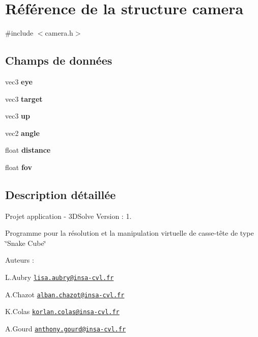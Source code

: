 \hypertarget{structcamera}{\section{Référence de la structure camera}
\label{structcamera}
}


{\ttfamily \#include $<$camera.\-h$>$}

\subsection*{Champs de données}
\begin{DoxyCompactItemize}
\item 
\hypertarget{structcamera_a59c7cca5ec718e42f0b3d58b033932c1}{vec3 {\bfseries eye}}\label{structcamera_a59c7cca5ec718e42f0b3d58b033932c1}

\item 
\hypertarget{structcamera_a71f586eb04bc4185d0d3c4c366e63896}{vec3 {\bfseries target}}\label{structcamera_a71f586eb04bc4185d0d3c4c366e63896}

\item 
\hypertarget{structcamera_af25e132b20481c5c82d8394e0beeea4a}{vec3 {\bfseries up}}\label{structcamera_af25e132b20481c5c82d8394e0beeea4a}

\item 
\hypertarget{structcamera_a4a261f99dfaa5397faf5fc9eba20218b}{vec2 {\bfseries angle}}\label{structcamera_a4a261f99dfaa5397faf5fc9eba20218b}

\item 
\hypertarget{structcamera_a06f14a9abd47b91465f895d5259cdc1b}{float {\bfseries distance}}\label{structcamera_a06f14a9abd47b91465f895d5259cdc1b}

\item 
\hypertarget{structcamera_abfd94a01fc71278021802ca0d1e25e16}{float {\bfseries fov}}\label{structcamera_abfd94a01fc71278021802ca0d1e25e16}

\end{DoxyCompactItemize}


\subsection{Description détaillée}
Projet application -\/ 3\-D\-Solve Version \-: 1.

Programme pour la résolution et la manipulation virtuelle de casse-\/tête de type \char`\"{}\-Snake Cube\char`\"{}

Auteurs \-:
\begin{DoxyItemize}
\item L.\-Aubry \href{mailto:lisa.aubry@insa-cvl.fr}{\tt lisa.\-aubry@insa-\/cvl.\-fr}
\item A.\-Chazot \href{mailto:alban.chazot@insa-cvl.fr}{\tt alban.\-chazot@insa-\/cvl.\-fr}
\item K.\-Colas \href{mailto:korlan.colas@insa-cvl.fr}{\tt korlan.\-colas@insa-\/cvl.\-fr}
\item A.\-Gourd \href{mailto:anthony.gourd@insa-cvl.fr}{\tt anthony.\-gourd@insa-\/cvl.\-fr}
\end{DoxyItemize}

